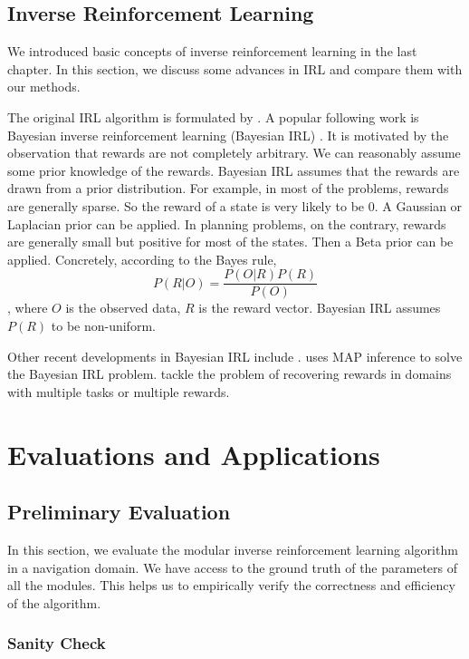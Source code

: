 \documentclass[12pt]{report}	%
\theoremstyle{definition}
\theoremstyle{remark}
\begin{document}
\section{Inverse Reinforcement Learning}

We introduced basic concepts of inverse reinforcement learning in the last
chapter. In this section, we discuss some advances in IRL and compare them with
our methods.

The original IRL algorithm is formulated by
\cite{abbeel2004apprenticeship,ng2000algorithms}. A popular following work is
Bayesian inverse reinforcement learning (Bayesian IRL) \cite{ramachandran2007bayesian}.
It is motivated by the
observation that rewards are not completely arbitrary. We can reasonably assume
some prior knowledge of the rewards. Bayesian IRL assumes that the rewards are
drawn from a prior distribution. 
For example, in most of the problems, rewards are generally sparse. So the
reward of a state is very likely to be 0. A Gaussian or Laplacian prior can be
applied.  In planning problems, on the contrary, rewards are generally small but
positive for most of the states. Then a Beta prior can be applied.
Concretely, according to the Bayes rule,
$$P(R|O) = \frac{P(O|R)P(R)}{P(O)}$$
, where $O$ is the observed data, $R$ is the reward vector. Bayesian IRL assumes
$P(R)$ to be non-uniform.

Other recent developments in Bayesian IRL include
\cite{choi2011map,choi2012nonparametric,dimitrakakis2012bayesian}.
\cite{choi2011map} uses MAP inference to solve the Bayesian IRL problem.
\cite{choi2012nonparametric,dimitrakakis2012bayesian} tackle the problem of
recovering rewards in domains with multiple tasks or multiple rewards. 


\chapter{Evaluations and Applications}
\label{chp:eval}
\section{Preliminary Evaluation}

In this section, we evaluate the modular inverse reinforcement learning
algorithm in a navigation domain. We have access to the ground truth of the
parameters of all the modules. This helps us to empirically verify the
correctness and efficiency of the algorithm.

\subsection{Sanity Check}
\end{document}
